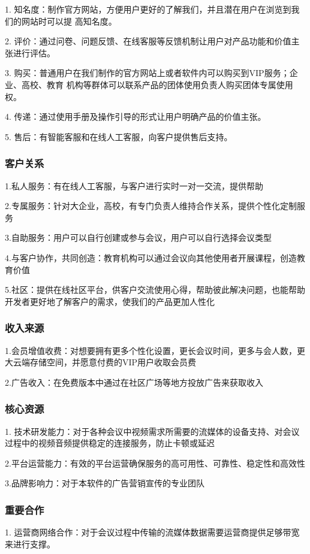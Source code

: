 \documentclass[a4paper,12pt]{article}
\begin{document}
    1. 知名度：制作官方网站，方便用户更好的了解我们，并且潜在用户在浏览到我们的网站时可以提
    高知名度。

    2. 评价：通过问卷、问题反馈、在线客服等反馈机制让用户对产品功能和价值主张进行评估。

    3. 购买：普通用户在我们制作的官方网站上或者软件内可以购买到VIP服务；企业、高校、教育
    机构等群体可以联系产品的团体使用负责人购买团体专属使用权。

    4. 传递：通过使用手册及操作引导的形式让用户明确产品的价值主张。

    5. 售后：有智能客服和在线人工客服，向客户提供售后支持。
    \subsubsection{客户关系}
    1.私人服务：有在线人工客服，与客户进行实时一对一交流，提供帮助

    2.专属服务：针对大企业，高校，有专门负责人维持合作关系，提供个性化定制服务

    3.自助服务：用户可以自行创建或参与会议，用户可以自行选择会议类型

    4.与客户协作，共同创造：教育机构可以通过会议向其他使用者开展课程，创造教育价值

    5.社区：提供在线社区平台，供客户交流使用心得，帮助彼此解决问题，也能帮助开发者更好地了解客户的需求，使我们的产品更加人性化
    \subsubsection{收入来源}
    1.会员增值收费：对想要拥有更多个性化设置，更长会议时间，更多与会人数，更大云端存储空间，并愿意付费的VIP用户收取会员费

    2.广告收入：在免费版本中通过在社区广场等地方投放广告来获取收入
    \subsubsection{核心资源}
    1. 技术研发能力：对于各种会议中视频需求所需要的流媒体的设备支持、对会议过程中的视频音频提供稳定的连接服务，防止卡顿或延迟

    2.平台运营能力：有效的平台运营确保服务的高可用性、可靠性、稳定性和高效性

    3.品牌影响力：对于本软件的广告营销宣传的专业团队

    \subsubsection{重要合作}
    1. 运营商网络合作：对于会议过程中传输的流媒体数据需要运营商提供足够带宽来进行支撑。
\end{document}
